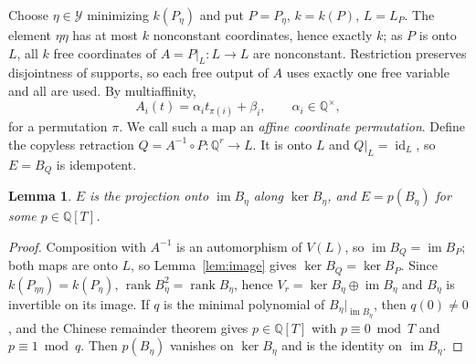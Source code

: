 \documentclass[11pt,letterpaper]{article}
\newcommand{\Q}{\mathbb{Q}}
\newcommand{\cY}{\mathcal{Y}}
\newcommand{\im}{\operatorname{im}}
\newcommand{\id}{\operatorname{id}}
\newtheorem{lemma}[theorem]{Lemma}
\theoremstyle{definition}
\begin{document}
Choose $\eta\in\cY$ minimizing $k(P_{\eta})$ and put $P=P_{\eta}$, $k=k(P)$, $L=L_P$. The element $\eta\eta$ has at most $k$ nonconstant coordinates, hence exactly $k$; as $P$ is onto $L$, all $k$ free coordinates of $A=P|_L:L\to L$ are nonconstant. Restriction preserves disjointness of supports, so each free output of $A$ uses exactly one free variable and all are used. By multiaffinity,
\begin{equation}\label{eq:affineperm}
 A_i(t)=\alpha_it_{\pi(i)}+\beta_i,\qquad\alpha_i\in\Q^\times,
\end{equation}
for a permutation $\pi$. We call such a map an \emph{affine coordinate permutation}. Define the copyless retraction $Q=A^{-1}\circ P:\Q^r\to L$. It is onto $L$ and $Q|_L=\id_L$, so $E=B_Q$ is idempotent.

\begin{lemma}\label{lem:projection}
$E$ is the projection onto $\im B_{\eta}$ along $\ker B_{\eta}$, and $E=p(B_{\eta})$ for some $p\in\Q[T]$.
\end{lemma}
\begin{proof}
Composition with $A^{-1}$ is an automorphism of $V(L)$, so $\im B_Q=\im B_P$; both maps are onto $L$, so Lemma~\ref{lem:image} gives $\ker B_Q=\ker B_P$. Since $k(P_{\eta\eta})=k(P_{\eta})$, $\operatorname{rank}B_{\eta}^2=\operatorname{rank}B_{\eta}$, hence $V_r=\ker B_{\eta}\oplus\im B_{\eta}$ and $B_{\eta}$ is invertible on its image. If $q$ is the minimal polynomial of $B_{\eta}|_{\im B_{\eta}}$, then $q(0)\ne0$, and the Chinese remainder theorem gives $p\in\Q[T]$ with $p\equiv0\bmod T$ and $p\equiv1\bmod q$. Then $p(B_{\eta})$ vanishes on $\ker B_{\eta}$ and is the identity on $\im B_{\eta}$.
\end{proof}
\end{document}
